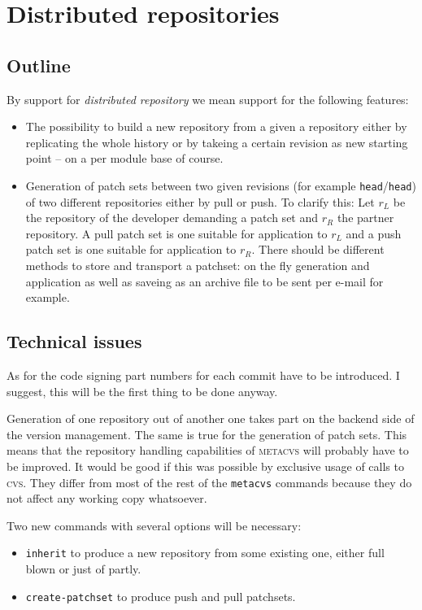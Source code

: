 \documentclass[fleqn, german, 10pt, a4paper]{article}
\begin{document}
\section{Distributed repositories}

\subsection{Outline}

By support for \emph{distributed repository} we mean support for the following
features:

\begin{itemize}
\item The possibility to build a new repository from a given a 
repository either by replicating the whole history or
by takeing a certain revision as new starting point -- on a per module
base of course.
\item Generation of patch sets between two given revisions (for example
\texttt{head}/\texttt{head}) of two different repositories either by pull
or push. To clarify this: Let $r_L$ be the repository of the developer
demanding a patch set and $r_R$ the partner repository. A pull patch set
is one suitable for application to $r_L$ and a push patch set is one
suitable for application to $r_R$.
There should be different methods to store and transport a patchset:
on the fly generation and application as well as saveing as an archive file
to be sent per e-mail for example.
\end{itemize}

\subsection{Technical issues}

As for the code signing part numbers for each commit have
to be introduced. I suggest, this will be the first thing to be done anyway.

Generation of one repository out of another one takes part on the backend
side of the version management. The same is true for the generation
of patch sets. This means that the repository handling capabilities of
\textsc{metacvs} will probably have to be improved. It would be good if
this was possible by exclusive usage of calls to \textsc{cvs}.
They differ from most of the rest of the \texttt{metacvs} commands
because they do not affect any working copy whatsoever.

Two new commands with several options will be necessary:
\begin{itemize}
\item \texttt{inherit} to produce a new repository from some existing one,
either full blown or just of partly.
\item \texttt{create-patchset} to produce push and pull patchsets.
\end{itemize}
\end{document}
